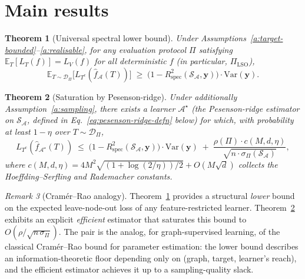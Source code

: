 \documentclass[11pt,a4paper]{article}
\theoremstyle{plain}
\newtheorem{theorem}{Theorem}
\theoremstyle{definition}
\theoremstyle{remark}
\newtheorem{remark}[theorem]{Remark}
\newcommand{\by}{\mathbf{y}}
\newcommand{\E}{\mathbb{E}}
\newcommand{\Var}{\mathrm{Var}}
\newcommand{\Rspec}{R^2_{\mathrm{spec}}}
\newcommand{\Scal}{\mathcal{S}}
\newcommand{\Acal}{\mathcal{A}}
\newcommand{\Dcal}{\mathcal{D}}
\begin{document}
\section{Main results}
\label{sec:main}

\begin{theorem}[Universal spectral lower bound]
\label{thm:lower-bound}
Under Assumptions~\ref{a:target-bounded}--\ref{a:realisable}, for any
evaluation protocol $\Pi$ satisfying $\E_T[L_T(f)] = L_V(f)$ for all
deterministic $f$ (in particular, $\Pi_{\mathrm{LSO}}$),
\begin{equation}
    \E_{T \sim \Dcal_\Pi}\!\big[L_{T^c}(\hat f_\Acal(T))\big]
    \;\geq\; \big(1 - \Rspec(\Scal_\Acal, \by)\big) \cdot \Var(\by).
    \label{eq:thm-lower}
\end{equation}
\end{theorem}

\begin{theorem}[Saturation by Pesenson-ridge]
\label{thm:saturation}
Under additionally Assumption~\ref{a:sampling}, there exists a learner
$\Acal^\star$ (the Pesenson-ridge estimator on $\Scal_\Acal$, defined
in Eq.~\eqref{eq:pesenson-ridge-defn} below) for which, with probability
at least $1 - \eta$ over $T \sim \Dcal_\Pi$,
\begin{equation}
    L_{T^c}(\hat f_{\Acal^\star}(T))
    \;\leq\; \big(1 - \Rspec(\Scal_\Acal, \by)\big) \cdot \Var(\by)
        \;+\; \frac{\rho(\Pi) \cdot c(M, d, \eta)}{\sqrt{n \cdot \sigma_\Pi(\Scal_\Acal)}},
    \label{eq:thm-saturation}
\end{equation}
where $c(M, d, \eta) = 4 M^2 \sqrt{(1 + \log(2/\eta))/2} + O(M \sqrt{d})$
collects the Hoeffding--Serfling and Rademacher constants.
\end{theorem}

\begin{remark}[Cram\'er--Rao analogy]
\label{rem:cramer-rao}
Theorem~\ref{thm:lower-bound} provides a structural \emph{lower}
bound on the expected leave-node-out loss of any feature-restricted
learner.  Theorem~\ref{thm:saturation} exhibits an explicit
\emph{efficient} estimator that saturates this bound to
$O(\rho/\sqrt{n\,\sigma_\Pi})$.  The pair is the analog, for
graph-supervised learning, of the classical Cram\'er--Rao bound for
parameter estimation: the lower bound describes an information-theoretic
floor depending only on (graph, target, learner's reach), and the
efficient estimator achieves it up to a sampling-quality slack.
\end{remark}
\end{document}
